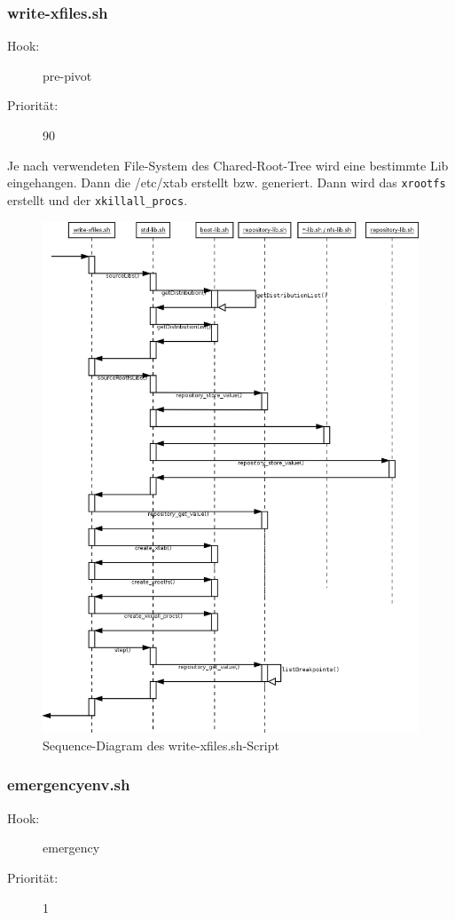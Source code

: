 \documentclass[10pt,a4paper]{article}
\begin{document}
\subsubsection{write-xfiles.sh}
\begin{description}
\item[Hook:] pre-pivot
\item[Priorität:] 90
\end{description}

Je nach verwendeten File-System des Chared-Root-Tree wird eine bestimmte Lib eingehangen. Dann die /etc/xtab erstellt bzw.  generiert. Dann wird das \texttt{xrootfs} erstellt und der \texttt{xkillall\_procs}.

\begin{figure}[H]
 \centering
 \includegraphics[width=1.0\textwidth,height=1.0\textwidth]{./sequence_diagram_write-xfiles_DE_de.png}
 \caption[]{Sequence-Diagram des write-xfiles.sh-Script}
\end{figure}

\subsubsection{emergencyenv.sh}
\begin{description}
\item[Hook:] emergency
\item[Priorität:] 1
\end{description}
\end{document}
